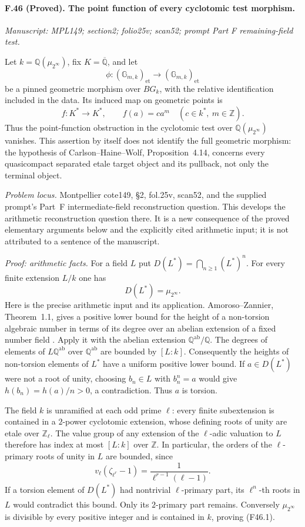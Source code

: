 \paragraph{F.46 (Proved). The point function of every cyclotomic test morphism.}
\textit{Manuscript: MPL149; section2; folio25v; scan52; prompt Part F remaining-field test.}

Let $k=\mathbb Q(\mu_{2^\infty})$, fix $K=\overline{\mathbb Q}$, and let
\[
 \phi:(\mathbb G_{m,k})_{\mathrm{et}}
       \longrightarrow(\mathbb G_{m,k})_{\mathrm{et}}
\]
be a pinned geometric morphism over $B G_k$, with the relative
identification included in the data. Its induced map on geometric
points is
\[
 f:K^*\longrightarrow K^*,\qquad f(a)=c a^m
 \quad(c\in k^*,\ m\in\mathbb Z).
 \tag{F46}
\]
Thus the point-function obstruction in the cyclotomic test over
$\mathbb Q(\mu_{2^\infty})$ vanishes. This assertion by itself does not identify the full geometric
morphism: the hypothesis of Carlson--Haine--Wolf,
Proposition~4.14, concerns every quasicompact separated etale target
object and its pullback, not only the terminal object.

\emph{Problem locus.} Montpellier cote149, \S2, fol.25v, scan52,
and the supplied prompt's Part~F intermediate-field reconstruction question.
This develops the arithmetic reconstruction question there.
It is a new consequence of the proved elementary arguments
below and the explicitly cited arithmetic input; it is not attributed
to a sentence of the manuscript.

\emph{Proof: arithmetic facts.}
For a field $L$ put $D(L^*)=\bigcap_{n\geq1}(L^*)^n$.
For every finite extension $L/k$ one has
\[
 D(L^*)=\mu_{2^\infty}.                                      \tag{F46.1}
\]
Here is the precise arithmetic input and its application.
Amoroso--Zannier, Theorem~1.1, gives a positive lower bound for the
height of a non-torsion algebraic number in terms of its degree over
an abelian extension of a fixed number field
\cite{AmorosoZannier2000}. Apply it with the abelian extension
$\mathbb Q^{\mathrm{ab}}/\mathbb Q$. The degrees of elements of
$L\mathbb Q^{\mathrm{ab}}$ over $\mathbb Q^{\mathrm{ab}}$ are bounded
by $[L:k]$. Consequently the heights of non-torsion elements of $L^*$
have a uniform positive lower bound. If $a\in D(L^*)$ were not a root
of unity, choosing $b_n\in L$ with $b_n^n=a$ would give
$h(b_n)=h(a)/n>0$, a contradiction. Thus $a$ is torsion.

The field $k$ is unramified at each odd prime $\ell$: every finite
subextension is contained in a $2$-power cyclotomic extension, whose
defining roots of unity are etale over $\mathbb Z_\ell$. The value
group of any extension of the $\ell$-adic valuation to $L$ therefore
has index at most $[L:k]$ over $\mathbb Z$. In particular, the orders
of the $\ell$-primary roots of unity in $L$ are bounded, since
\[
 v_\ell(\zeta_{\ell^r}-1)
       =\frac{1}{\ell^{r-1}(\ell-1)}.
\]
If a torsion element of $D(L^*)$ had nontrivial $\ell$-primary part,
its $\ell^n$-th roots in $L$ would contradict this bound. Only its
$2$-primary part remains. Conversely $\mu_{2^\infty}$ is divisible
by every positive integer and is contained in $k$, proving (F46.1).

